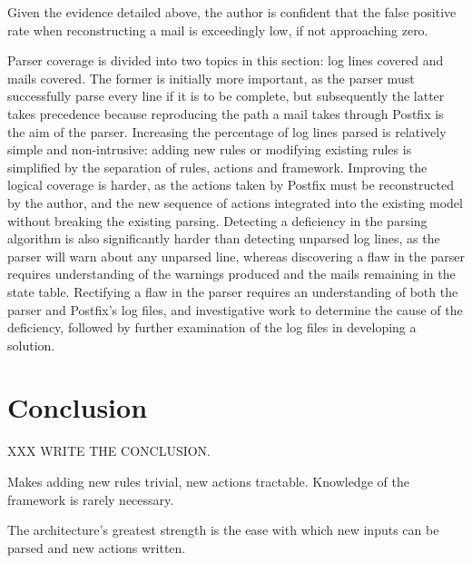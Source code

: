 \documentclass[draft]{svmult}
\begin{document}
Given the evidence detailed above, the author is confident that the false
positive rate when reconstructing a mail is exceedingly low, if not
approaching zero.

Parser coverage is divided into two topics in this section: log lines
covered and mails covered.  The former is initially more important, as the
parser must successfully parse every line if it is to be complete, but
subsequently the latter takes precedence because reproducing the path a
mail takes through Postfix is the aim of the parser.  Increasing the
percentage of log lines parsed is relatively simple and non-intrusive:
adding new rules or modifying existing rules is simplified by the
separation of rules, actions and framework.  Improving the logical coverage
is harder, as the actions taken by Postfix must be reconstructed by the
author, and the new sequence of actions integrated into the existing model
without breaking the existing parsing.  Detecting a deficiency in the
parsing algorithm is also significantly harder than detecting unparsed log
lines, as the parser will warn about any unparsed line, whereas discovering
a flaw in the parser requires understanding of the warnings produced and
the mails remaining in the state table.  Rectifying a flaw in the parser
requires an understanding of both the parser and Postfix's log files, and
investigative work to determine the cause of the deficiency, followed by
further examination of the log files in developing a solution.

\section{Conclusion}

XXX WRITE THE CONCLUSION\@.

Makes adding new rules trivial, new actions tractable.  Knowledge of the
framework is rarely necessary.

The architecture's greatest strength is the ease with which new inputs can
be parsed and new actions written.



\label{bibliography}

\renewcommand{\glossarytitle}{\section{Glossary}\label{Glossary}}
\printglossary{}

\end{document}

